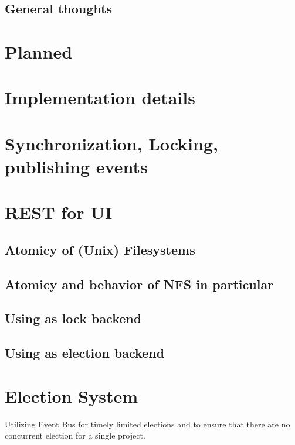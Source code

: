 \subsection{General thoughts}

\section{Planned}

\section{Implementation details}

\section{Synchronization, Locking, publishing events}

\section{REST for UI}




\subsection{Atomicy of (Unix) Filesystems}

\subsection{Atomicy and behavior of NFS in particular}

\subsection{Using as lock backend}

\subsection{Using as election backend}



\section{Election System}

Utilizing Event Bus for timely limited elections and to ensure that there are no concurrent election for a single project.

